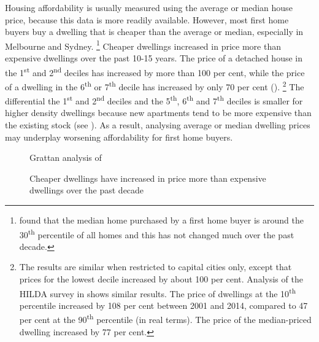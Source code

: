 Housing affordability is usually measured using the average or median house price, because this data is more readily available.
However, most first home buyers buy a dwelling that is cheaper than the average or median, especially in Melbourne and Sydney.%
	\footnote{\textcite[][16]{Simon-Stone-2017-Property-Ladder} found that the median home purchased by a first home buyer is around the 30\textsuperscript{th} percentile of all homes and this has not changed much over the past decade.}
Cheaper dwellings increased in price more than expensive dwellings over the past 10-15 years.
The price of a detached house in the 1\textsuperscript{st} and  2\textsuperscript{nd} deciles has increased by more than 100 per cent, while the price of a dwelling in the 6\textsuperscript{th} or 7\textsuperscript{th} decile has increased by only 70 per cent ().%
	\footnote{The results are similar when restricted to capital cities only, except that prices for the lowest decile increased by about 100 per cent. Analysis of the HILDA survey in  \textcite{Wilkins2016HouseholdIncomeLabour} shows similar results.
	The price of dwellings at the 10\textsuperscript{th} percentile increased by 108 per cent between 2001 and 2014, compared to 47 per cent at the 90\textsuperscript{th} percentile (in real terms).
	The price of the median-priced dwelling increased by 77 per cent.}
The differential the 1\textsuperscript{st} and  2\textsuperscript{nd} deciles and the 5\textsuperscript{th}, 6\textsuperscript{th} and 7\textsuperscript{th} deciles is smaller for higher density dwellings because new apartments tend to be more expensive than the existing stock (see ).
As a result, analysing average or median dwelling prices may underplay worsening affordability for first home buyers.


\begin{figure}
\caption{Cheaper dwellings have increased in price more than expensive dwellings over the past decade}\label{fig:house-price-deciles}
%
{Grattan analysis of \textcites{ABS-HES-201516-Microdata}{ABS-HES-200304-Microdata}}
\end{figure}

